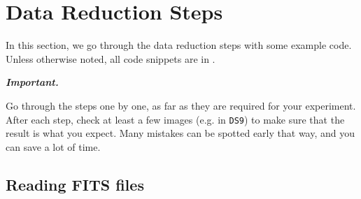 \documentclass[a4paper, 11pt, fleqn]{memoir}
\newenvironment{important}{
    \begin{propBox}
        \textcolor{oneblue}{\textbf{\textit{Important.}}}
        }{
    \end{propBox}
}
\begin{document}








\section{Data Reduction Steps}
\label{section:data_red_steps}

In this section, we go through the data reduction steps with some example code.
Unless otherwise noted, all code snippets are in .

\begin{important}
    Go through the steps one by one, as far as they are required for your experiment.
    After each step, check at least a few images (e.g. in \texttt{DS9}) to make sure that the result is what you expect.
    Many mistakes can be spotted early that way, and you can save a lot of time.
\end{important}

\subsection{Reading FITS files}
\end{document}

